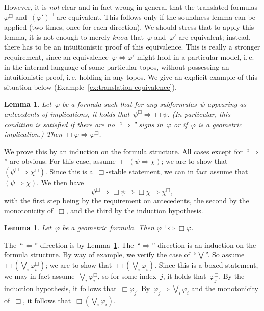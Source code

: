 \documentclass[10pt,reqno,a4paper]{amsbook}
\makeatletter
\theoremstyle{definition}
\theoremstyle{plain}
\newtheorem{lemma}[defn]{Lemma}
\theoremstyle{remark}
\newcommand{\?}{\,{:}\,}
\renewcommand{\_}{\mathpunct{.}\,}
\newcommand{\ie}{i.\,e.\@\xspace}
\renewenvironment{proof}[1][\proofname]{\par
  \pushQED{\qed}%
  \normalfont \topsep6\p@\@plus6\p@\relax
  \trivlist
  \item[\hskip\labelsep
        \itshape
    #1\@addpunct{.}]\ignorespaces
}{%
  \popQED\endtrivlist\@endpefalse
}
\makeatother
\begin{document}
However, it is \emph{not} clear and in fact wrong in general that the translated formulas~$\varphi^\Box$
and~$(\varphi')^\Box$ are equivalent. This follows only if the soundness
lemma can be applied (two times, once for each direction). We should stress that to apply this
lemma, it is not enough to merely \emph{know} that~$\varphi$ and~$\varphi'$ are
equivalent; instead, there has to be an intuitionistic proof of this
equivalence. This is really a stronger requirement, since an
equivalence~$\varphi \Leftrightarrow \varphi'$ might
hold in a particular model, \ie in the internal language of some particular
topos, without possessing an intuitionistic proof, \ie holding in any topos. We
give an explicit example of this situation below
(Example~\ref{ex:translation-equivalence}).

\begin{lemma}\label{lemma:open-stalk}
Let~$\varphi$ be a formula such that for any subformulas~$\psi$
appearing as antecedents of implications, it holds that~$\psi^\Box \Rightarrow
\Box\psi$. (In particular, this condition is satisfied if there are
no~``$\Rightarrow$'' signs in~$\varphi$ or if~$\varphi$ is a geometric implication.) Then $\Box\varphi \Rightarrow
\varphi^\Box$.\end{lemma}
\begin{proof}We prove this by an induction on the formula structure. All cases
except for~``$\Rightarrow$'' are obvious. For this case, assume~$\Box(\psi
\Rightarrow \chi)$; we are to show that~$(\psi^\Box \Rightarrow \chi^\Box)$.
Since this is a~$\Box$-stable statement, we can in fact assume that~$(\psi
\Rightarrow \chi)$. We then have
\[ \psi^\Box \Longrightarrow \Box\psi \Longrightarrow \Box\chi
\Longrightarrow \chi^\Box, \]
with the first step being by the requirement on antecedents, the second by the
monotonicity of~$\Box$, and the third by the induction hypothesis.
\end{proof}

\begin{lemma}\label{lemma:stalk-open}
Let~$\varphi$ be a geometric formula.
Then $\varphi^\Box \Leftrightarrow \Box\varphi$.\end{lemma}
\begin{proof}The~``$\Leftarrow$'' direction is by Lemma~\ref{lemma:open-stalk}.
The~``$\Rightarrow$'' direction is an induction on the formula structure. By way of example, we verify
the case of~``$\bigvee$''. So assume~$\Box(\bigvee_i \varphi_i^\Box)$; we are
to show that~$\Box(\bigvee_i \varphi_i)$. Since this is a boxed statement, we
may in fact assume~$\bigvee_i \varphi_i^\Box$, so for some index~$j$, it holds
that~$\varphi_j^\Box$. By the induction hypothesis, it follows
that~$\Box\varphi_j$. By~$\varphi_j \Rightarrow \bigvee_i \varphi_i$ and the
monotonicity of~$\Box$, it follows that~$\Box(\bigvee_i \varphi_i)$.
\end{proof}
\end{document}

